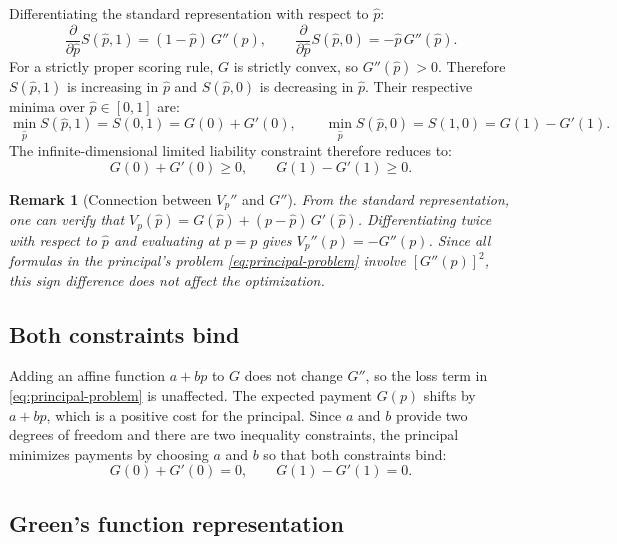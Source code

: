 \documentclass[11pt]{article}
\newtheorem{remark}{Remark}
\begin{document}
Differentiating the standard representation with respect to $\hat{p}$:
\[
\frac{\partial}{\partial \hat{p}} S(\hat{p}, 1) = (1-\hat{p})\,G''(\hat{p}), \qquad
\frac{\partial}{\partial \hat{p}} S(\hat{p}, 0) = -\hat{p}\,G''(\hat{p}).
\]
For a strictly proper scoring rule, $G$ is strictly convex, so $G''(\hat{p}) > 0$. Therefore $S(\hat{p}, 1)$ is increasing in $\hat{p}$ and $S(\hat{p}, 0)$ is decreasing in $\hat{p}$. Their respective minima over $\hat{p} \in [0,1]$ are:
\[
\min_{\hat{p}} S(\hat{p}, 1) = S(0, 1) = G(0) + G'(0), \qquad \min_{\hat{p}} S(\hat{p}, 0) = S(1, 0) = G(1) - G'(1).
\]
The infinite-dimensional limited liability constraint therefore reduces to:
\begin{equation}\label{eq:ll-reduced}
G(0) + G'(0) \geq 0, \qquad G(1) - G'(1) \geq 0.
\end{equation}

\begin{remark}[Connection between $V_p''$ and $G''$]\label{rem:curvature-connection}
From the standard representation, one can verify that $V_p(\hat{p}) = G(\hat{p}) + (p - \hat{p})\,G'(\hat{p})$. Differentiating twice with respect to $\hat{p}$ and evaluating at $\hat{p} = p$ gives $V_p''(p) = -G''(p)$. Since all formulas in the principal's problem \eqref{eq:principal-problem} involve $[G''(p)]^2$, this sign difference does not affect the optimization.
\end{remark}

\subsection{Both constraints bind}

Adding an affine function $a + bp$ to $G$ does not change $G''$, so the loss term in \eqref{eq:principal-problem} is unaffected. The expected payment $G(p)$ shifts by $a + bp$, which is a positive cost for the principal. Since $a$ and $b$ provide two degrees of freedom and there are two inequality constraints, the principal minimizes payments by choosing $a$ and $b$ so that both constraints bind:
\begin{equation}\label{eq:boundary}
G(0) + G'(0) = 0, \qquad G(1) - G'(1) = 0.
\end{equation}

\subsection{Green's function representation}\label{sec:greens}
\end{document}
